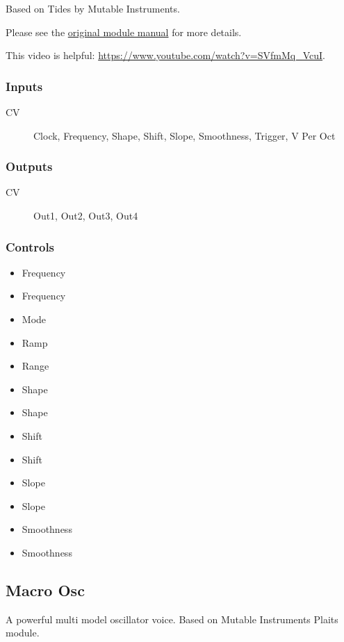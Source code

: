 Based on Tides by Mutable Instruments.

Please see the \href{https://www.mutable-instruments.net/modules/tides/manual/}{original module manual} for more details.

This video is helpful: \url{https://www.youtube.com/watch?v=SVfmMq_VcuI}.

\subsubsection{Inputs}
\begin{description}
\item [CV] Clock, Frequency, Shape, Shift, Slope, Smoothness, Trigger, V Per Oct
\end{description}

\subsubsection{Outputs}
\begin{description}
\item [CV] Out1, Out2, Out3, Out4
\end{description}

\subsubsection{Controls}
\begin{itemize}
\item Frequency
\item Frequency
\item Mode
\item Ramp
\item Range
\item Shape
\item Shape
\item Shift
\item Shift
\item Slope
\item Slope
\item Smoothness
\item Smoothness
\end{itemize}

\subsection{Macro Osc}

A powerful multi model oscillator voice. Based on Mutable Instruments Plaits module.



